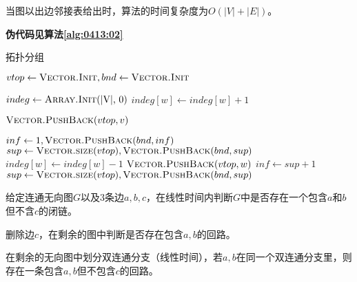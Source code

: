 \begin{questions}
\begin{solution}
        当图以出边邻接表给出时，算法的时间复杂度为$O(|V| + |E|)$。

        \textbf{伪代码见算法\ref{alg:0413:02}}

    \end{solution}

    \begin{algorithm}[!htp]
        \caption{拓扑分组} \label{alg:0413:02}
        \begin{algorithmic}[1]

            \State $vtop \gets \Call{Vector.Init}{}, bnd \gets \Call{Vector.Init}{}$

            \State $indeg \gets \Call{Array.Init}{$|V|, 0$}$  
            \State $indeg[w] \gets indeg[w] + 1$
            \EndFor

             
            \State $\Call{Vector.PushBack}{vtop, v}$
            \EndFor

            \Statex {}
            \State $inf \gets 1, \Call{Vector.PushBack}{bnd, inf}$
            \State $sup \gets \Call{Vector.size}{vtop}, \Call{Vector.PushBack}{bnd, sup}$
             
             
            \State $indeg[w] \gets indeg[w] - 1$ 
             
            \State $\Call{Vector.PushBack}{vtop, w}$
            \EndIf
            \EndFor
            \EndFor
            \State $inf \gets sup + 1$
            \State $sup \gets \Call{Vector.size}{vtop}, \Call{Vector.PushBack}{bnd, sup}$
            \EndWhile
        \end{algorithmic}
    \end{algorithm}

    \question 给定连通无向图$G$以及3条边$a,b,c$，在线性时间内判断$G$中是否存在一个包含$a$和$b$但不含$c$的闭链。

    \begin{solution}
        删除边$c$，在剩余的图中判断是否存在包含$a,b$的回路。

        在剩余的无向图中划分双连通分支（线性时间），若$a,b$在同一个双连通分支里，则存在一条包含$a,b$但不包含$c$的回路。
    \end{solution}

\end{questions}

